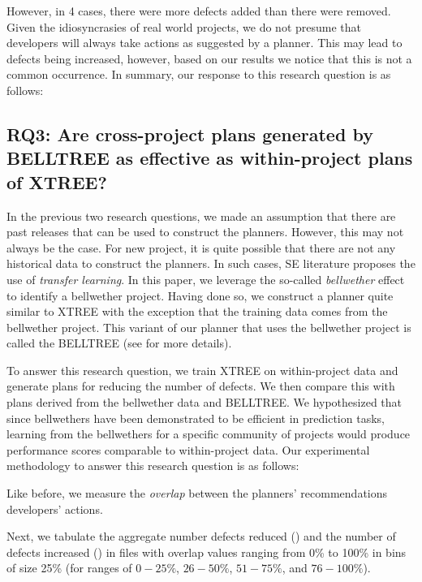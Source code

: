 However, in 4 cases, there were more defects added than there were removed. Given the idiosyncrasies  of real world projects, we do not presume that developers will always take actions as suggested by a planner. This may lead to defects being increased, however, based on our results we notice that this is not a common occurrence.
In summary, our response to this research question is as follows:

\noindent{}

\vspace{-0.4em}

\subsection*{{\bf RQ3: Are  cross-project  plans  generated  by  BELLTREE  as  effective  as  within-project plans of XTREE?}}


In the previous two research questions, we made an assumption that there are past releases that can be used to construct the planners. However, this may not always be the case. For new project, it is quite possible that there are not any historical data to construct the planners. In such cases, SE literature proposes the use of \textit{transfer learning}. In this paper, we leverage the so-called \textit{bellwether} effect to identify a bellwether project. Having done so, we construct a planner quite similar to XTREE with the exception that the training data comes from the bellwether project. This variant of our planner that uses the bellwether project is called the BELLTREE (see  for more details).

To answer this research question, we train XTREE on within-project data and generate plans for reducing the number of defects. We then compare this with plans derived from the bellwether data and BELLTREE. We hypothesized that since bellwethers have been demonstrated to be efficient in prediction tasks, learning from the bellwethers for a specific community of projects would produce performance scores comparable to within-project data. Our experimental methodology to answer this research question is as follows: 
\be
\item Like before, we measure the \textit{overlap} between the planners' recommendations developers' actions. 
\item Next, we tabulate the aggregate number defects reduced (\protect{}) and the number of defects increased (\protect{}) in files with overlap values ranging from 0\% to 100\% in bins of size 25\% (for ranges of $0-25\%$, $26-50\%$, $51-75\%$, and $76-100\%$). 
\ee

